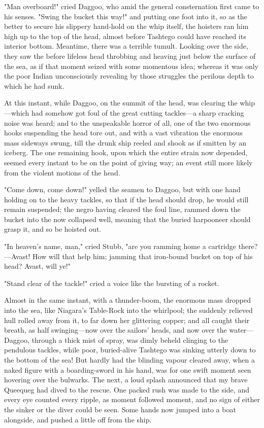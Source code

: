 \documentclass{article}
\begin{document}
"Man overboard!" cried Daggoo, who amid the general consternation first came to his senses. "Swing the bucket this way!" and putting one foot into it, so as the better to secure his slippery hand-hold on the whip itself, the hoisters ran him high up to the top of the head, almost before Tashtego could have reached its interior bottom. Meantime, there was a terrible tumult. Looking over the side, they saw the before lifeless head throbbing and heaving just below the surface of the sea, as if that moment seized with some momentous idea; whereas it was only the poor Indian unconsciously revealing by those struggles the perilous depth to which he had sunk.

At this instant, while Daggoo, on the summit of the head, was clearing the whip—which had somehow got foul of the great cutting tackles—a sharp cracking noise was heard; and to the unspeakable horror of all, one of the two enormous hooks suspending the head tore out, and with a vast vibration the enormous mass sideways swung, till the drunk ship reeled and shook as if smitten by an iceberg. The one remaining hook, upon which the entire strain now depended, seemed every instant to be on the point of giving way; an event still more likely from the violent motions of the head.

"Come down, come down!" yelled the seamen to Daggoo, but with one hand holding on to the heavy tackles, so that if the head should drop, he would still remain suspended; the negro having cleared the foul line, rammed down the bucket into the now collapsed well, meaning that the buried harpooneer should grasp it, and so be hoisted out.

"In heaven's name, man," cried Stubb, "are you ramming home a cartridge there?—Avast! How will that help him; jamming that iron-bound bucket on top of his head? Avast, will ye!"

"Stand clear of the tackle!" cried a voice like the bursting of a rocket.

Almost in the same instant, with a thunder-boom, the enormous mass dropped into the sea, like Niagara's Table-Rock into the whirlpool; the suddenly relieved hull rolled away from it, to far down her glittering copper; and all caught their breath, as half swinging—now over the sailors' heads, and now over the water—Daggoo, through a thick mist of spray, was dimly beheld clinging to the pendulous tackles, while poor, buried-alive Tashtego was sinking utterly down to the bottom of the sea! But hardly had the blinding vapour cleared away, when a naked figure with a boarding-sword in his hand, was for one swift moment seen hovering over the bulwarks. The next, a loud splash announced that my brave Queequeg had dived to the rescue. One packed rush was made to the side, and every eye counted every ripple, as moment followed moment, and no sign of either the sinker or the diver could be seen. Some hands now jumped into a boat alongside, and pushed a little off from the ship.
\end{document}
